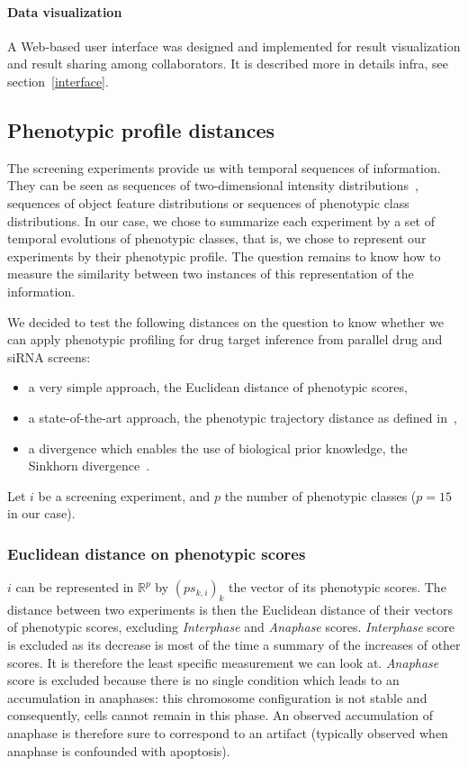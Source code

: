 \paragraph{Data visualization}
A Web-based user interface was designed and implemented for result visualization and result sharing among collaborators. It is described more in details infra, see section~\ref{interface}.

\subsection{Phenotypic profile distances}
\label{sec:distances}
The screening experiments provide us with temporal sequences of
information. They can be seen as sequences of 
two-dimensional intensity distributions~\cite{pmid22743764}, sequences of object
feature distributions or sequences of phenotypic class
distributions. In our case, we chose to summarize each experiment by a
set of temporal evolutions of phenotypic classes, that is, we chose to
represent our experiments by their phenotypic profile. The question
remains to know how to measure the similarity between two instances of
this representation of the information. 

We decided to test the following distances on the question to know whether we can apply phenotypic profiling for drug target inference from parallel drug and siRNA screens:
\begin{itemize}
\item a very simple approach, the Euclidean distance of phenotypic scores, 
\item a state-of-the-art approach, the phenotypic trajectory distance as defined in~\cite{Walter2010},
\item a divergence which enables the use of biological prior knowledge, the Sinkhorn divergence~\cite{sinkhorn}.
\end{itemize}

Let $i$ be a screening experiment, and $p$ the number of phenotypic classes ($p=15$ in our case). 
\subsubsection{Euclidean distance on phenotypic scores}
$i$ can be represented in $\mathbb{R}^p$ by $(ps_{k,i})_k$ the vector
of its phenotypic scores. The distance between two experiments is then
the Euclidean distance of their vectors of phenotypic scores,
excluding \textit{Interphase} and \textit{Anaphase}
scores. \textit{Interphase} score is excluded as its decrease is most
of the time a summary of the increases of other scores. It is
therefore the least specific measurement we can look
at. \textit{Anaphase} score is excluded because there is no single
condition which leads to an accumulation in anaphases: this chromosome
configuration is not stable and consequently, cells cannot remain in
this phase. An observed accumulation of anaphase is therefore sure to
correspond to an artifact (typically observed when anaphase is
confounded with apoptosis). 

